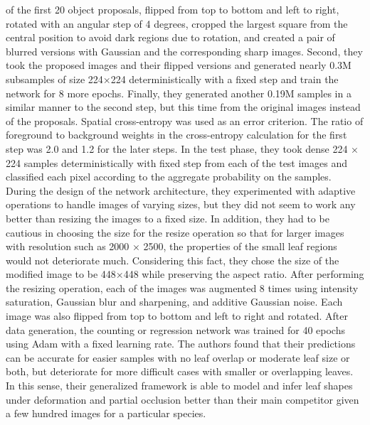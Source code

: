 of the first 20 object proposals, flipped from top to bottom and left to right, rotated with an angular step of 4 degrees, cropped the largest square from the central
position to avoid dark regions due to rotation, and created a pair of blurred versions with Gaussian and the corresponding sharp images. Second, they took the proposed
images and their flipped versions and generated nearly 0.3M subsamples of size 224×224 deterministically with a fixed step and train the network for 8 more epochs.
Finally, they generated another 0.19M samples in a similar manner to the second step, but this time from the original images instead of the proposals. Spatial
cross-entropy was used as an error criterion. The ratio of foreground to background weights in the cross-entropy calculation for the first step was 2.0 and 1.2
for the later steps. In the test phase, they took dense 224 × 224 samples deterministically with fixed step from each of the test images and classified each pixel
according to the aggregate probability on the samples. During the design of the network architecture, they experimented with adaptive operations to handle images
of varying sizes, but they did not seem to work any better than resizing the images to a fixed size. In addition, they had to be cautious in choosing the size for
the resize operation so that for larger images with resolution such as 2000 × 2500, the properties of the small leaf regions would not deteriorate much. Considering
this fact, they chose the size of the modified image to be 448×448 while preserving the aspect ratio. After performing the resizing operation, each of the images was
augmented 8 times using intensity saturation, Gaussian blur and sharpening, and additive Gaussian noise. Each image was also flipped from top to bottom and left to
right and rotated. After data generation, the counting or regression network was trained for 40 epochs using Adam with a fixed learning rate. The authors found that
their predictions can be accurate for easier samples with no leaf overlap or moderate leaf size or both, but deteriorate for more difficult cases with smaller or overlapping
leaves. In this sense, their generalized framework is able to model and infer leaf shapes under deformation and partial occlusion better than their main competitor given a
few hundred images for a particular species.

